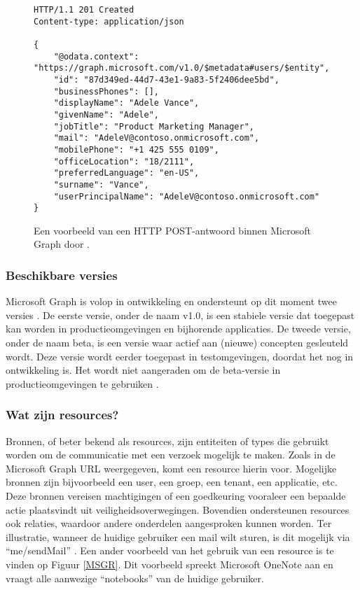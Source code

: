 \begin{figure}[h]
    \scriptsize
    \begin{verbatim}
HTTP/1.1 201 Created
Content-type: application/json

{
    "@odata.context": "https://graph.microsoft.com/v1.0/$metadata#users/$entity",
    "id": "87d349ed-44d7-43e1-9a83-5f2406dee5bd",
    "businessPhones": [],
    "displayName": "Adele Vance",
    "givenName": "Adele",
    "jobTitle": "Product Marketing Manager",
    "mail": "AdeleV@contoso.onmicrosoft.com",
    "mobilePhone": "+1 425 555 0109",
    "officeLocation": "18/2111",
    "preferredLanguage": "en-US",
    "surname": "Vance",
    "userPrincipalName": "AdeleV@contoso.onmicrosoft.com"
}
    \end{verbatim}    
    \caption[Voorbeeld Microsoft Graph POST-antwoord]{Een voorbeeld van een \ac{HTTP} POST-antwoord binnen Microsoft Graph door \textcite{Microsoft2022e}.}
    \label{MSPRES}
\end{figure}

\subsubsection{Beschikbare versies}

Microsoft Graph is volop in ontwikkeling en ondersteunt op dit moment twee versies \Autocite{Microsoft2023f}. De eerste versie, onder de naam v1.0, is een stabiele versie dat toegepast kan worden in productieomgevingen en bijhorende applicaties. De tweede versie, onder de naam beta, is een versie waar actief aan (nieuwe) concepten gesleuteld wordt. Deze versie wordt eerder toegepast in testomgevingen, doordat het nog in ontwikkeling is. Het wordt niet aangeraden om de beta-versie in productieomgevingen te gebruiken \autocite{Microsoft2023vv}. 

\subsubsection{Wat zijn resources?}

Bronnen, of beter bekend als resources, zijn entiteiten of types die gebruikt worden om de communicatie met een verzoek mogelijk te maken. Zoals in de Microsoft Graph \ac{URL} weergegeven, komt een resource hierin voor. Mogelijke bronnen zijn bijvoorbeeld een user, een groep, een tenant, een applicatie, etc. Deze bronnen vereisen machtigingen of een goedkeuring vooraleer een bepaalde actie plaatsvindt uit veiligheidsoverwegingen. Bovendien ondersteunen resources ook relaties, waardoor andere onderdelen aangesproken kunnen worden. Ter illustratie, wanneer de huidige gebruiker een mail wilt sturen, is dit mogelijk via “me/sendMail” \autocite{Microsoft2023vv}. Een ander voorbeeld van het gebruik van een resource is te vinden op Figuur \ref{MSGR}. Dit voorbeeld spreekt Microsoft OneNote aan en vraagt alle aanwezige “notebooks” van de huidige gebruiker. \\

